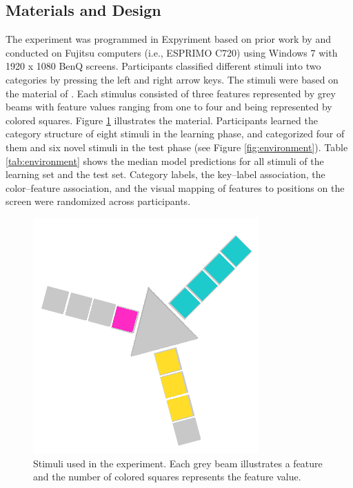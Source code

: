 \documentclass[a4paper,man,natbib]{apa6}
\begin{document}
\subsection{Materials and Design}
The experiment was programmed in Expyriment \citep{krause2014expyriment} based on prior work by \cite{albrechtxxxunstacking} and conducted on Fujitsu computers (i.e., ESPRIMO C720) using Windows 7 with 1920 x 1080 BenQ screens. Participants classified different stimuli into two categories by pressing the left and right arrow keys. The stimuli were based on the material of \cite{albrechtxxxunstacking}. Each stimulus consisted of three features represented by grey beams with feature values ranging from one to four and being represented by colored squares. Figure \ref{fig:material} illustrates the material. Participants learned the category structure of eight stimuli in the learning phase, and categorized four of them and six novel stimuli in the test phase (see Figure \ref{fig:environment}). Table \ref{tab:environment} shows the median model predictions for all stimuli of the learning set and the test set. Category labels, the key--label association, the color--feature association, and the visual mapping of features to positions on the screen were randomized across participants.

\begin{figure}
\centering
\includegraphics{fig_material.PNG}
\caption{Stimuli used in the experiment. Each grey beam illustrates a feature and the number of colored squares represents the feature value.}
\label{fig:material}
\end{figure}
\end{document}
